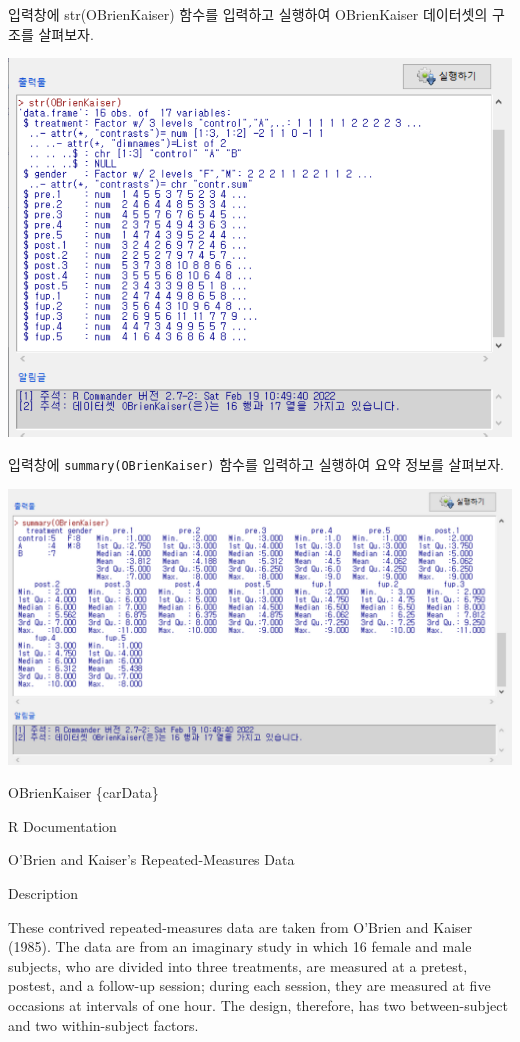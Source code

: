 \documentclass[
]{book}
\begin{document}
입력창에 str(OBrienKaiser) 함수를 입력하고 실행하여 OBrienKaiser 데이터셋의 구조를 살펴보자.

\includegraphics{fig/dataset-obrien-01.png}

입력창에 \texttt{summary(OBrienKaiser)} 함수를 입력하고 실행하여 요약 정보를 살펴보자.

\includegraphics{fig/dataset-obrien-02.png}

OBrienKaiser \{carData\}

R Documentation

O'Brien and Kaiser's Repeated-Measures Data

Description

These contrived repeated-measures data are taken from
O'Brien and Kaiser (1985). The data are from an imaginary study in which
16 female and male subjects, who are divided into three treatments, are measured
at a pretest, postest, and a follow-up session; during each session, they are
measured at five occasions at intervals of one hour. The design, therefore, has
two between-subject and two within-subject factors.
\end{document}
